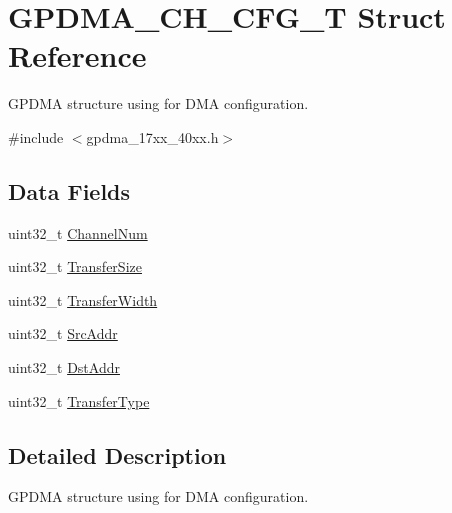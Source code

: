 \hypertarget{structGPDMA__CH__CFG__T}{\section{G\-P\-D\-M\-A\-\_\-\-C\-H\-\_\-\-C\-F\-G\-\_\-\-T Struct Reference}
\label{structGPDMA__CH__CFG__T}
}


G\-P\-D\-M\-A structure using for D\-M\-A configuration.  




{\ttfamily \#include $<$gpdma\-\_\-17xx\-\_\-40xx.\-h$>$}

\subsection*{Data Fields}
\begin{DoxyCompactItemize}
\item 
uint32\-\_\-t \hyperlink{structGPDMA__CH__CFG__T_a9a37cb463108848cc37e79d230f34602}{Channel\-Num}
\item 
uint32\-\_\-t \hyperlink{structGPDMA__CH__CFG__T_a5666efb9edb055974b590443ea45ed7b}{Transfer\-Size}
\item 
uint32\-\_\-t \hyperlink{structGPDMA__CH__CFG__T_a7aff974420b56393365cc335015ba8df}{Transfer\-Width}
\item 
uint32\-\_\-t \hyperlink{structGPDMA__CH__CFG__T_a53adde93dea1ba4ce81af0fd4bd3e66e}{Src\-Addr}
\item 
uint32\-\_\-t \hyperlink{structGPDMA__CH__CFG__T_a6e67f866c02d9a27662c798bac0554b8}{Dst\-Addr}
\item 
uint32\-\_\-t \hyperlink{structGPDMA__CH__CFG__T_a6c21f3fe48e5e23443a324f9a42a3886}{Transfer\-Type}
\end{DoxyCompactItemize}


\subsection{Detailed Description}
G\-P\-D\-M\-A structure using for D\-M\-A configuration. 

